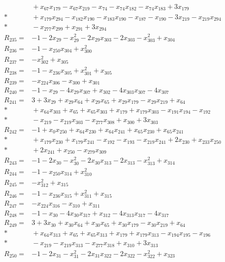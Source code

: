 \begin{align*}
&{}+x_{67}x_{179}-x_{67}x_{219}-x_{74}-x_{74}x_{182}-x_{74}x_{183}+3x_{179}\\*
&{}+x_{179}x_{294}-x_{182}x_{190}-x_{183}x_{190}-x_{187}-x_{190}-3x_{219}-x_{219}x_{294}\\*
&{}-x_{277}x_{299}+x_{291}+3x_{294}\\[3pt]
R_{235}={}&-1-2x_{29}-x_{29}^{2}-2x_{29}x_{303}-2x_{303}-x_{303}^{2}+x_{304}\\[3pt]
R_{236}={}&-1-x_{250}x_{304}+x_{300}^{2}\\[3pt]
R_{237}={}&-x_{302}^{2}+x_{305}\\[3pt]
R_{238}={}&-1-x_{236}x_{305}+x_{301}^{2}+x_{305}\\[3pt]
R_{239}={}&-x_{224}x_{306}-x_{300}+x_{301}\\[3pt]
R_{240}={}&-1-x_{29}-4x_{29}x_{307}+x_{302}-4x_{303}x_{307}-4x_{307}\\[3pt]
R_{241}={}&3+3x_{29}+x_{29}x_{64}+x_{29}x_{65}+x_{29}x_{179}-x_{29}x_{219}+x_{64}\\*
&{}+x_{64}x_{303}+x_{65}+x_{65}x_{303}+x_{179}+x_{179}x_{303}-x_{191}x_{194}-x_{192}\\*
&{}-x_{219}-x_{219}x_{303}-x_{277}x_{308}+x_{300}+3x_{303}\\[3pt]
R_{242}={}&-1+x_{0}x_{250}+x_{64}x_{230}+x_{64}x_{241}+x_{65}x_{230}+x_{65}x_{241}\\*
&{}+x_{179}x_{230}+x_{179}x_{241}-x_{192}-x_{193}-x_{219}x_{241}+2x_{230}+x_{233}x_{250}\\*
&{}+2x_{241}+x_{250}-x_{279}x_{309}\\[3pt]
R_{243}={}&-1-2x_{30}-x_{30}^{2}-2x_{30}x_{313}-2x_{313}-x_{313}^{2}+x_{314}\\[3pt]
R_{244}={}&-1-x_{250}x_{314}+x_{310}^{2}\\[3pt]
R_{245}={}&-x_{312}^{2}+x_{315}\\[3pt]
R_{246}={}&-1-x_{236}x_{315}+x_{311}^{2}+x_{315}\\[3pt]
R_{247}={}&-x_{224}x_{316}-x_{310}+x_{311}\\[3pt]
R_{248}={}&-1-x_{30}-4x_{30}x_{317}+x_{312}-4x_{313}x_{317}-4x_{317}\\[3pt]
R_{249}={}&3+3x_{30}+x_{30}x_{64}+x_{30}x_{65}+x_{30}x_{179}-x_{30}x_{219}+x_{64}\\*
&{}+x_{64}x_{313}+x_{65}+x_{65}x_{313}+x_{179}+x_{179}x_{313}-x_{194}x_{195}-x_{196}\\*
&{}-x_{219}-x_{219}x_{313}-x_{277}x_{318}+x_{310}+3x_{313}\\[3pt]
R_{250}={}&-1-2x_{31}-x_{31}^{2}-2x_{31}x_{322}-2x_{322}-x_{322}^{2}+x_{323}\\[3pt]

\end{align*}
